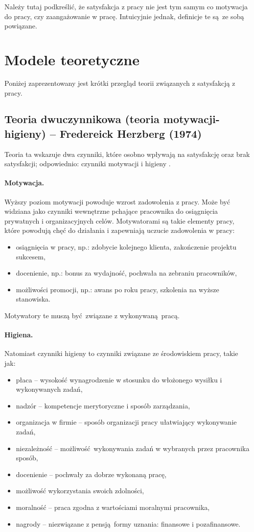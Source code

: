 Należy tutaj podkreślić, że satysfakcja z pracy nie jest tym samym co motywacja do pracy, czy zaangażowanie w pracę. Intuicyjnie jednak, definicje te są ze sobą powiązane.

\section{Modele teoretyczne}
Poniżej zaprezentowany jest krótki przegląd teorii związanych z satysfakcją z pracy.

\subsection{Teoria dwuczynnikowa (teoria motywacji-higieny) -- Fredereick Herzberg (1974)}
\label{sec:theory-sat-herz}
Teoria ta wskazuje dwa czynniki, które osobno wpływają na satysfakcję oraz brak satysfakcji; odpowiednio: czynniki motywacji i higieny \cite{herzberg1974motivation}. 

\paragraph{Motywacja.} Wyższy poziom motywacji powoduje wzrost zadowolenia z pracy. Może być widziana jako czynniki wewnętrzne pchające pracownika do osiągnięcia prywatnych i organizacyjnych celów. Motywatorami są takie elementy pracy, które powodują chęć do działania i zapewniają uczucie zadowolenia w pracy:
\begin{itemize}
\item osiągnięcia w pracy, np.: zdobycie kolejnego klienta, zakończenie projektu sukcesem,
\item docenienie, np.: bonus za wydajność, pochwała na zebraniu pracowników,
\item możliwości promocji, np.: awans po roku pracy, szkolenia na wyższe stanowiska.
\end{itemize}
Motywatory te muszą być związane z wykonywaną pracą.

\paragraph{Higiena.} Natomiast czynniki higieny to czynniki związane ze środowiskiem pracy, takie jak:
\begin{itemize}
\item płaca -- wysokość wynagrodzenie w stosunku do włożonego wysiłku i wykonywanych zadań, 
\item nadzór -- kompetencje merytoryczne i sposób zarządzania,
\item organizacja w firmie -- sposób organizacji pracy ułatwiający wykonywanie zadań, 
\item niezależność -- możliwość wykonywania zadań w wybranych przez pracownika sposób,
\item docenienie -- pochwały za dobrze wykonaną pracę,
\item możliwość wykorzystania swoich zdolności,
\item moralność -- praca zgodna z wartościami moralnymi pracownika,
\item nagrody -- niezwiązane z pensją formy uznania: finansowe i pozafinansowe.
\end{itemize}

